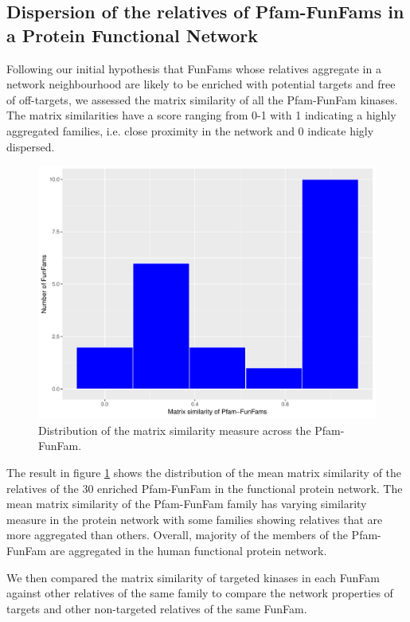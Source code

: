 \documentclass[a4paper, 11pt]{report}
\begin{document}
\subsection{Dispersion of the relatives of Pfam-FunFams in a Protein Functional Network}
Following our initial hypothesis that FunFams whose relatives aggregate in a network neighbourhood are likely to be enriched with potential targets and free of off-targets, we assessed the matrix similarity of all the Pfam-FunFam kinases.  The matrix similarities have a score ranging from 0-1 with 1 indicating a highly aggregated families, i.e. close proximity in the network and 0 indicate higly dispersed. 
\begin{figure}[H]
	\includegraphics[width=.8\linewidth]{figures/matrixsim.pdf}
	\centering
	\caption{Distribution of the matrix similarity measure across the Pfam-FunFam.}
	\label{ksim_plot}
\end{figure}
The result in figure \ref{ksim_plot} shows the distribution of the mean matrix similarity of the relatives of the 30 enriched Pfam-FunFam in the functional protein network. The mean matrix similarity of the Pfam-FunFam family has varying similarity measure in the protein network with some families showing relatives that are more aggregated than others. Overall, majority of the members of the Pfam-FunFam are aggregated in the human functional protein network.\par
We then compared the matrix similarity of targeted kinases in each FunFam against other relatives of the same family to compare the network properties of targets and other non-targeted relatives of the same FunFam. 
\end{document}
